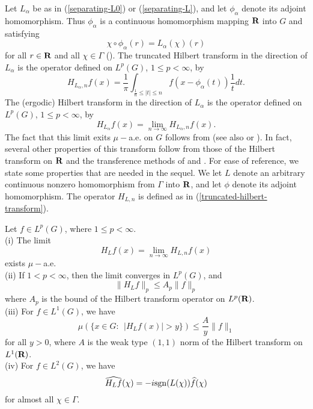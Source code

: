 Let $L_\alpha$ be as in (\ref{separating-L0}) or 
(\ref{separating-L}), and let $\phi_\alpha$ denote its
adjoint homomorphism.  Thus $\phi_\alpha$ is a continuous
homomorphism mapping $\R$ into $G$ and satisfying
\begin{equation}
\chi \circ \phi_\alpha (r)=L_\alpha (\chi)(r)
\label{adjoint-map}
\end{equation}
for all $r\in \R$ and all $\chi \in \Gamma$ 
(\cite[Section 24]{hr1}).  The truncated Hilbert 
transform in the direction of $L_\alpha$ is the
operator defined on $L^p(G)$, $1\leq p<\infty$, by
\begin{equation}
H_{L_\alpha ,n}f (x)=\frac{1}{\pi} \int_{\frac{1}{n}\leq |t|\leq n}
			f(x-\phi_\alpha (t))\frac{1}{t}dt.
\label{truncated-hilbert-transform}
\end{equation}
%
The (ergodic) Hilbert transform in the direction of $L_\alpha$ 
is the operator defined on 
$L^p(G)$, $1\leq p<\infty$,  by
\begin{equation}
H_{L_\alpha}f(x) = \lim_{n\rightarrow\infty} H_{L_\alpha ,n}f (x).
\label{hilbert-transform}
\end{equation}
The fact that this limit exits $\mu-$a.e. on $G$ follows from 
\cite{cot} (see also \cite{cal} or
\cite{cw}).  In fact, several other
properties of this transform follow from those
of the Hilbert transform on $\R$ and the transference
methods of \cite{cal} and
\cite{cw}.  For ease of reference, we state some 
properties that are needed in the sequel.  
We let $L$ denote
an arbitrary continuous nonzero 
homomorphism from $\Gamma$ into $\R$, and
let $\phi$ denote its adjoint homomorphism.
The operator $H_{L,n}$ is defined as in 
(\ref{truncated-hilbert-transform}).
\begin{ergodic-hilbert-transform}
Let $f\in L^p(G)$, where $1\leq p<\infty$. \\
(i)  The limit
$$H_L f(x) = \lim_{n\rightarrow\infty} H_{L,n}f (x)$$
exists $\mu-$a.e.\\
(ii)  If $1<p<\infty$, then the limit converges in 
$L^p(G)$, and 
$$\|H_L f\|_p\leq A_p \|f\|_p$$
where $A_p$ is the bound of the Hilbert transform
operator on $L^p(\R)$.\\
(iii)  For $f\in L^1(G)$, we have
$$\mu\left(\{x\in G :\ \ | H_L f(x)|>y\}\right)\leq
		\frac{A}{y} \|f\|_1$$
for all $y>0$, where $A$ is the weak type $(1,1)$
norm of the Hilbert transform on $L^1(\R)$.\\
(iv)  For $f\in L^2(G)$, we have
$$\widehat{H_L f}(\chi)=- i {\rm sgn} (L (\chi))\widehat{f}(\chi)$$
for almost all $\chi\in \Gamma$.   
\label{ergodic-hilbert-transform}
\end{ergodic-hilbert-transform}
